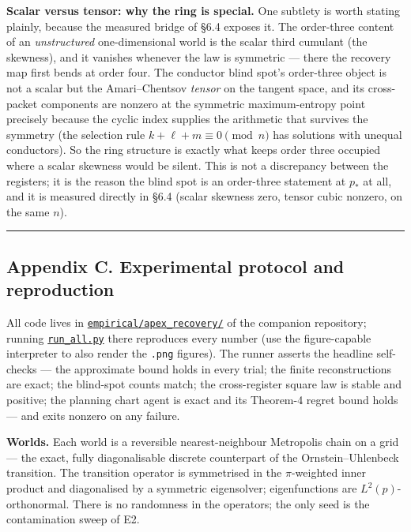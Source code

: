 \documentclass[
  letterpaper,
  11pt]{article}
\theoremstyle{plain}
\theoremstyle{definition}
\theoremstyle{remark}
\begin{document}
\textbf{Scalar versus tensor: why the ring is special.} One subtlety is worth stating plainly, because the measured bridge of §6.4 exposes it. The order-three content of an \emph{unstructured} one-dimensional world is the scalar third cumulant (the skewness), and it vanishes whenever the law is symmetric --- there the recovery map first bends at order four. The conductor blind spot's order-three object is not a scalar but the Amari--Chentsov \emph{tensor} on the tangent space, and its cross-packet components are nonzero at the symmetric maximum-entropy point precisely because the cyclic index supplies the arithmetic that survives the symmetry (the selection rule \(k+\ell+m\equiv 0\pmod n\) has solutions with unequal conductors). So the ring structure is exactly what keeps order three occupied where a scalar skewness would be silent. This is not a discrepancy between the registers; it is the reason the blind spot is an order-three statement at \(p_*\) at all, and it is measured directly in §6.4 (scalar skewness zero, tensor cubic nonzero, on the same \(n\)).

\begin{center}\rule{0.5\linewidth}{0.5pt}\end{center}

\subsection{Appendix C. Experimental protocol and reproduction}\label{sec:appC}

All code lives in \href{https://github.com/leomurillo/AI-ConductorBlindSpot/tree/main/empirical/apex_recovery}{\texttt{empirical/apex\_recovery/}} of the companion repository; running \href{https://github.com/leomurillo/AI-ConductorBlindSpot/blob/main/empirical/apex_recovery/run_all.py}{\texttt{run\_all.py}} there reproduces every number (use the figure-capable interpreter to also render the \texttt{.png} figures). The runner asserts the headline self-checks --- the approximate bound holds in every trial; the finite reconstructions are exact; the blind-spot counts match; the cross-register square law is stable and positive; the planning chart agent is exact and its Theorem-4 regret bound holds --- and exits nonzero on any failure.

\textbf{Worlds.} Each world is a reversible nearest-neighbour Metropolis chain on a grid --- the exact, fully diagonalisable discrete counterpart of the Ornstein--Uhlenbeck transition. The transition operator is symmetrised in the \(\pi\)-weighted inner product and diagonalised by a symmetric eigensolver; eigenfunctions are \(L^2(p)\)-orthonormal. There is no randomness in the operators; the only seed is the contamination sweep of E2.
\end{document}

